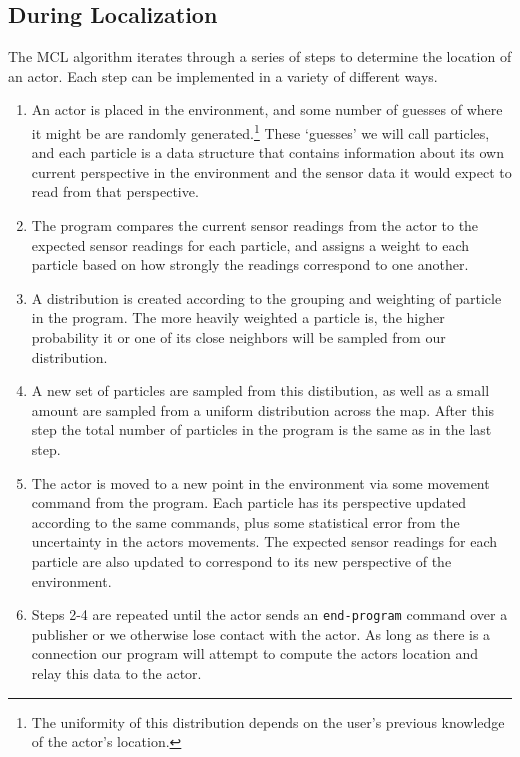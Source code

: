 \documentclass[a4paper,11pt]{article}
\begin{document}
\subsection{During Localization}
  The MCL algorithm iterates through a series of steps to determine the location of an actor. Each step can be implemented in a variety of different ways.
  \begin{enumerate}
  \item An actor is placed in the environment, and some number of guesses of where it might be are randomly generated.\footnote{The uniformity of this distribution depends on the user's previous knowledge of the actor's location.} These `guesses' we will call particles, and each particle is a data structure that contains information about its own current perspective in the environment and the sensor data it would expect to read from that perspective.
  \item The program compares the current sensor readings from the actor to the expected sensor readings for each particle, and assigns a weight to each particle based on how strongly the readings correspond to one another.
  \item A distribution is created according to the grouping and weighting of particle in the program. The more heavily weighted a particle is, the higher probability it or one of its close neighbors will be sampled from our distribution.
  \item A new set of particles are sampled from this distibution, as well as a small amount are sampled from a uniform distribution across the map. After this step the total number of particles in the program is the same as in the last step.
  \item The actor is moved to a new point in the environment via some movement command from the program. Each particle has its perspective updated according to the same commands, plus some statistical error from the uncertainty in the actors movements. The expected sensor readings for each particle are also updated to correspond to its new perspective of the environment.
  \item Steps 2-4 are repeated until the actor sends an \texttt{end-program} command over a publisher or we otherwise lose contact with the actor. As long as there is a connection our program will attempt to compute the actors location and relay this data to the actor.
  \end{enumerate} 
  
\end{document}
